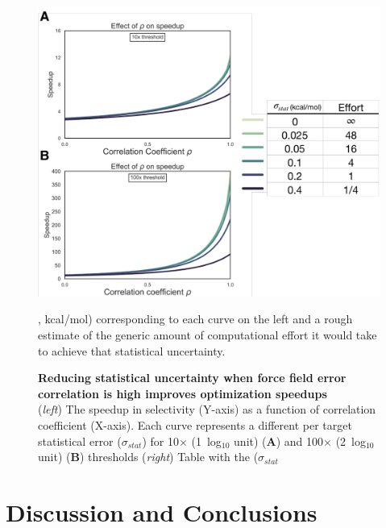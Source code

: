 \documentclass[phd,tocprelim]{cornell}
\begin{document}
\begin{landscape}
	\begin{figure}
		\centering
		\includegraphics[width=0.6\linewidth]{figures/figure6.pdf}
		\caption[Reducing statistical uncertainty when force field error correlation is high improves optimization speedups]{
{\bf Reducing statistical uncertainty when force field error correlation is high improves optimization speedups} \\
(\emph{left}) The speedup in selectivity (Y-axis) as a function of correlation coefficient (X-axis). Each curve represents a different per target statistical error ($\sigma_{stat}$) for 10$\times$ (1~log$_{10}$ unit) ({\bf A}) and 100$\times$ (2~log$_{10}$ unit) ({\bf B}) thresholds (\emph{right}) Table with the ($\sigma_{stat}$}, kcal/mol) corresponding to each curve on the left and a rough estimate of the generic amount of computational effort it would take to achieve that statistical uncertainty. 
		\label{fig:figure-5}
	\end{figure}
\end{landscape}


\section{Discussion and Conclusions}
\end{document}
